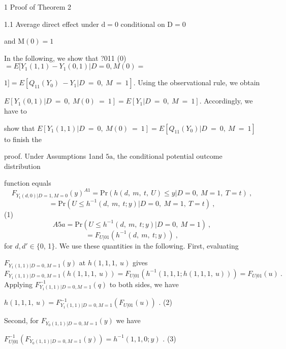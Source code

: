 \documentclass[a4paper,12pt]{article}
\begin{document}
1 Proof of Theorem 2

1.1 Average direct effect under $\mathrm{d}=0$ conditional on $\mathrm{D}=0$

and $\mathrm{M}(0)=1$

In the following, we show that ?011 (0) $= E[Y_{1}(1,1) -Y_{1}(0,1)|D = 0, M(0) =$

$1] = E[Q_{11}(Y_{0})\ -Y_{1}|D\ =\ 0,\ M\ =\ 1]$. Using the observational rule, we obtain

$E[Y_{1}(0,1)|D\ =\ 0,\ M(0)\ =\ 1] = E[Y_{1}|D\ =\ 0,\ M\ =\ 1]$. Accordingly, we have to

show that $E[Y_{1}(1,1)|D\ =\ 0,\ M(0)\ =\ 1] = E[Q_{11}(Y_{0})|D\ =\ 0,\ M\ =\ 1]$ to finish the

proof. Under Assumptions 1and $5\mathrm{a}$, the conditional potential outcome distribution

function equals
$$
F_{Y_{\mathrm{t}}(d,0)|D=1,M=0}(y)^{A1}=\mathrm{P}\mathrm{r}(h(d,\ m,\ t,\ U)\leq y|D=0,\ M=1,\ T=t)\ ,
$$
$$
=\mathrm{P}\mathrm{r}(U\leq h^{-1}(d,\ m,\ t;y)|D=0,\ M=1,\ T=t)\ ,
$$
(1)
$$
A5a=\mathrm{P}\mathrm{r}(U\leq h^{-1}(d,\ m,\ t;y)|D=0,\ M=1)\ ,
$$
$$
=F_{U|01}(h^{-1}(d,\ m,\ t;y))\ ,
$$
for $d, d' \in \{0$, 1$\}$. We use these quantities in the following. First, evaluating

$F_{Y_{1}(1,1)|D=0,M=1}(y)$ at $h(1,1,1,\ u)$ gives
$$
F_{Y_{1}(1,1)|D=0,M=1}(h(1,1,1,\ u))=F_{U|01}(h^{-1}(1,1,1;h(1,1,1,\ u)))=F_{U|01}(u)\ .
$$
Applying $F_{Y_{1}(1,1)|D=0,M=1}^{-1}(q)$ to both sides, we have
\begin{center}
$h(1,1,1,\ u)=F_{Y_{1}(1,1)|D=0,M=1}^{-1}(F_{U|01}(u))$ .   (2)
\end{center}
Second, for $F_{Y_{0}(1,1)|D=0,M=1}(y)$ we have
\begin{center}
$F_{U|01}^{-1}(F_{Y_{0}(1,1)|D=0,M=1}(y))=h^{-1}(1,1,0;y)$ .   (3)
\end{center}
\end{document}
